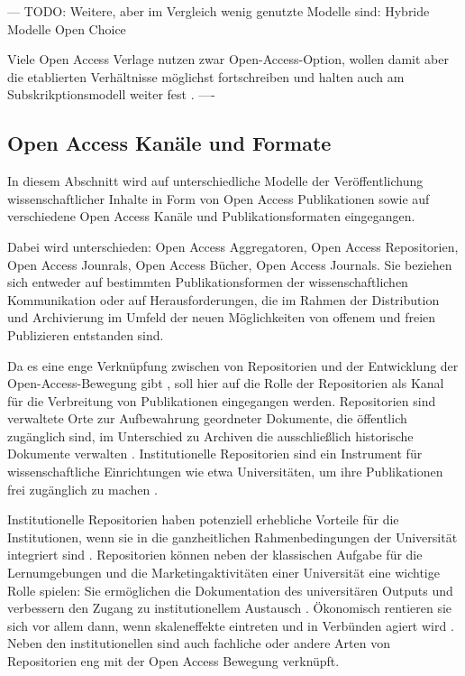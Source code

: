 --- TODO: Weitere, aber im Vergleich wenig genutzte Modelle sind:
Hybride Modelle
Open Choice \cite{Hess_2006} 

Viele Open Access Verlage nutzen zwar Open-Access-Option, wollen damit aber die etablierten Verhältnisse möglichst fortschreiben und halten auch am Subskrikptionsmodell weiter fest \cite{schmidt_2007_goldenen}.
----

\subsection{Open Access Kanäle und Formate}
In diesem Abschnitt wird auf unterschiedliche Modelle der Veröffentlichung wissenschaftlicher Inhalte in Form von Open Access Publikationen sowie auf verschiedene Open Access Kanäle und Publikationsformaten eingegangen.

Dabei wird unterschieden: Open Access Aggregatoren, Open Access Repositorien, Open Access Jounrals, Open Access Bücher, Open Access Journals. Sie beziehen sich entweder auf bestimmten Publikationsformen der wissenschaftlichen Kommunikation oder auf Herausforderungen, die im Rahmen der Distribution und Archivierung im Umfeld der neuen Möglichkeiten von offenem und freien Publizieren entstanden sind. 

Da es eine enge Verknüpfung zwischen von Repositorien und der Entwicklung der Open-Access-Bewegung gibt \cite{offhaus_2012_institutionelle_repos}, soll hier auf die Rolle der Repositorien als Kanal für die Verbreitung von Publikationen eingegangen werden. 
Repositorien sind verwaltete Orte zur Aufbewahrung geordneter Dokumente, die öffentlich zugänglich sind, im Unterschied zu Archiven die ausschließlich historische Dokumente verwalten \cite{suchen}. Institutionelle Repositorien sind ein Instrument für wissenschaftliche Einrichtungen wie etwa Universitäten, um ihre Publikationen frei zugänglich zu machen \cite{dobratz_2007_open}.

Institutionelle Repositorien haben potenziell erhebliche Vorteile für die Institutionen, wenn sie in die ganzheitlichen Rahmenbedingungen der Universität integriert sind \cite{steele_2006}. Repositorien können neben der klassischen Aufgabe für die Lernumgebungen und die Marketingaktivitäten einer Universität eine wichtige Rolle spielen: Sie ermöglichen die Dokumentation des universitären Outputs und verbessern den Zugang zu institutionellem Austausch \cite{steele_2006}. Ökonomisch rentieren sie sich vor allem dann, wenn skaleneffekte eintreten und in Verbünden agiert wird \cite{blythe_2005value}. Neben den institutionellen sind auch fachliche oder andere Arten von Repositorien eng mit der Open Access Bewegung verknüpft. 


